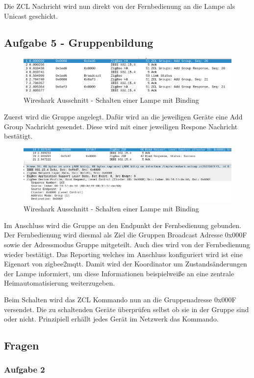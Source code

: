 Die ZCL Nachricht wird nun direkt von der Fernbedienung an die Lampe als Unicast geschickt.

\subsection{Aufgabe 5 - Gruppenbildung}

\begin{figure}[H]
    \centering
    \includegraphics[width=1\textwidth]{media/lsg-5-1.png}
    \caption{Wireshark Ausschnitt - Schalten einer Lampe mit Binding}
\end{figure}

Zuerst wird die Gruppe angelegt. Dafür wird an die jeweiligen Geräte eine Add Group Nachricht gesendet. Diese wird mit einer jeweiligen Respone
Nachricht bestätigt.

\begin{figure}[H]
    \centering
    \includegraphics[width=1\textwidth]{media/lsg-5-2.png}
    \caption{Wireshark Ausschnitt - Schalten einer Lampe mit Binding}
\end{figure}

Im Anschluss wird die Gruppe an den Endpunkt der Fernbedienung gebunden. Der Fernbedienung wird diesmal als Ziel die Gruppen Broadcast Adresse
0x000F sowie der Adressmodus Gruppe mitgeteilt. Auch dies wird von der Fernbedienung wieder bestätigt. Das Reporting welches im Anschluss 
konfiguriert wird ist eine Eigenart von zigbee2mqtt. Damit wird der Koordinator um Zustandsänderungen der Lampe informiert, um diese Informationen
beispielweiße an eine zentrale Heimautomatisierung weiterzugeben.

Beim Schalten wird das ZCL Kommando nun an die Gruppenadresse 0x000F versendet. Die zu schaltenden Geräte überprüfen selbst ob sie in der Gruppe sind 
oder nicht. Prinzipiell erhällt jedes Gerät im Netzwerk das Kommando.

\subsection{Fragen}
\subsubsection{Aufgabe 2}




